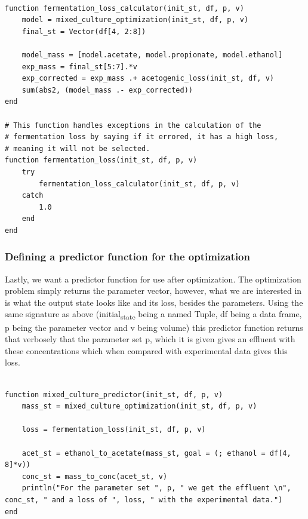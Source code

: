 \documentclass[11pt]{article}
\begin{document}
\begin{verbatim}

function fermentation_loss_calculator(init_st, df, p, v)
    model = mixed_culture_optimization(init_st, df, p, v)
    final_st = Vector(df[4, 2:8])

    model_mass = [model.acetate, model.propionate, model.ethanol]
    exp_mass = final_st[5:7].*v
    exp_corrected = exp_mass .+ acetogenic_loss(init_st, df, v)
    sum(abs2, (model_mass .- exp_corrected))
end

# This function handles exceptions in the calculation of the
# fermentation loss by saying if it errored, it has a high loss,
# meaning it will not be selected.
function fermentation_loss(init_st, df, p, v)
    try
        fermentation_loss_calculator(init_st, df, p, v)
    catch
        1.0
    end
end

\end{verbatim}

\subsubsection{Defining a predictor function for the optimization}
\label{sec:org5a94ed4}
Lastly, we want a predictor function for use after optimization. The optimization problem simply returns the parameter vector, however, what we are interested in is what the output state looks like and its loss, besides the parameters. Using the same signature as above (initial\textsubscript{state} being a named Tuple, df being a data frame, p being the parameter vector and v being volume) this predictor function returns that verbosely that the parameter set p, which it is given gives an effluent with these concentrations which when compared with experimental data gives this loss.

\begin{verbatim}

function mixed_culture_predictor(init_st, df, p, v)
    mass_st = mixed_culture_optimization(init_st, df, p, v)

    loss = fermentation_loss(init_st, df, p, v)

    acet_st = ethanol_to_acetate(mass_st, goal = (; ethanol = df[4, 8]*v))
    conc_st = mass_to_conc(acet_st, v)
    println("For the parameter set ", p, " we get the effluent \n", conc_st, " and a loss of ", loss, " with the experimental data.")
end

\end{verbatim}
\end{document}
